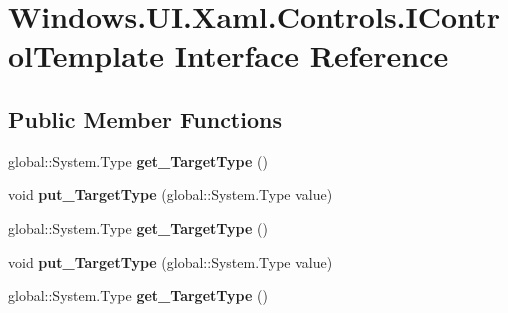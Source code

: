 \hypertarget{interface_windows_1_1_u_i_1_1_xaml_1_1_controls_1_1_i_control_template}{}\section{Windows.\+U\+I.\+Xaml.\+Controls.\+I\+Control\+Template Interface Reference}
\label{interface_windows_1_1_u_i_1_1_xaml_1_1_controls_1_1_i_control_template}
\subsection*{Public Member Functions}
\begin{DoxyCompactItemize}
\item 
\mbox{\label{interface_windows_1_1_u_i_1_1_xaml_1_1_controls_1_1_i_control_template_a91bdae7b666d0884f604ad219c80cd89}} 
global\+::\+System.\+Type {\bfseries get\+\_\+\+Target\+Type} ()
\item 
\mbox{\label{interface_windows_1_1_u_i_1_1_xaml_1_1_controls_1_1_i_control_template_a43b448ca845289c893fdacf44454c7d0}} 
void {\bfseries put\+\_\+\+Target\+Type} (global\+::\+System.\+Type value)
\item 
\mbox{\label{interface_windows_1_1_u_i_1_1_xaml_1_1_controls_1_1_i_control_template_a91bdae7b666d0884f604ad219c80cd89}} 
global\+::\+System.\+Type {\bfseries get\+\_\+\+Target\+Type} ()
\item 
\mbox{\label{interface_windows_1_1_u_i_1_1_xaml_1_1_controls_1_1_i_control_template_a43b448ca845289c893fdacf44454c7d0}} 
void {\bfseries put\+\_\+\+Target\+Type} (global\+::\+System.\+Type value)
\item 
\mbox{\label{interface_windows_1_1_u_i_1_1_xaml_1_1_controls_1_1_i_control_template_a91bdae7b666d0884f604ad219c80cd89}} 
global\+::\+System.\+Type {\bfseries get\+\_\+\+Target\+Type} ()
\item 

\end{DoxyCompactItemize}
